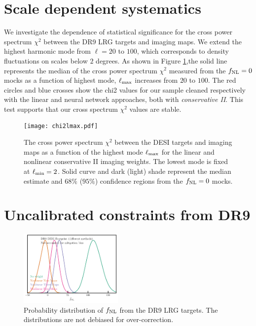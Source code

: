 \section{Scale dependent systematics}\label{sec:scalesys}
We investigate the dependence of statistical significance for the cross power spectrum $\chi^{2}$ between the DR9 LRG targets and imaging maps. We extend the highest harmonic mode from $\ell=20$ to $100$, which corresponds to density fluctuations on scales below $2$ degrees. As shown in Figure \ref{fig:chi2cellextend},the solid line represents the median of the cross power spectrum $\chi^{2}$ measured from the $f_{\rm NL}=0$ mocks as a function of highest mode, $\ell_{\rm max}$ increases from $20$ to $100$. The red circles and blue crosses show the chi2 values for our sample cleaned respectively with the linear and neural network approaches, both with \textit{conservative II}.  This test supports that our cross spectrum $\chi^{2}$ values are stable. 

\begin{figure}
\centering
\texttt{[image: chi2lmax.pdf]}
\caption{The cross power spectrum $\chi^{2}$ between the DESI targets and imaging maps as a function of the highest mode $\ell_{\rm max}$ for the linear and nonlinear conservative II imaging weights. The lowest mode is fixed at $\ell_{\rm min}=2$. Solid curve and dark (light) shade represent the median estimate and $68\%$ ($95\%$) confidence regions from the $f_{\rm NL}=0$ mocks.}\label{fig:chi2cellextend}
\end{figure}


\section{Uncalibrated constraints from DR9}\label{sec:dr9uncalib}

\begin{figure}
    \centering
    \includegraphics[width=0.45\textwidth]{figures/mcmc_dr9methods1dnoshift.pdf}
    \caption{Probability distribution of $f_{\rm NL}$ from the DR9 LRG targets. The distributions are not debiased for over-correction.}
    \label{fig:mcmcdr9noshift}
\end{figure}



